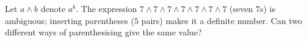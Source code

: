 Let $a\wedge b$ denote $a^b$. The expression $7\wedge7\wedge7\wedge7\wedge7\wedge7\wedge7$ (seven $7$s) is ambiguous; inserting parentheses ($5$ pairs) makes it a definite number. Can two different ways of parenthesising give the same value?
